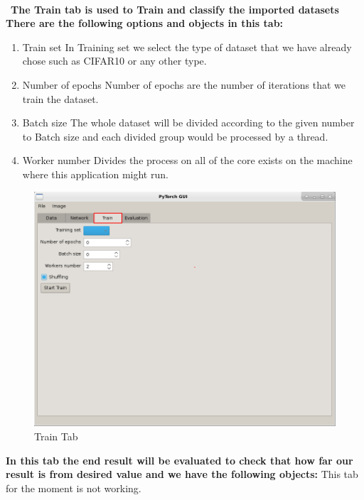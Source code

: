 \newpage

\\\
\textbf{The Train tab is used to Train and classify the imported datasets There are the following options and objects in this tab:}
\begin{enumerate}
    \item Train set \newline
        In Training set we select the type of dataset that we have already chose such as CIFAR10 or any other type.
    \item Number of epochs \newline
        Number of epochs are the number of iterations that we train the dataset.
    \item Batch size \newline
        The whole dataset will be divided according to the given number to Batch size and each divided group would be processed by a thread.
    \item Worker number \newline
        Divides the process on all of the core exists on the machine where this application might run.
\end{enumerate}

\begin{figure}[h!]
    \centering 
    \includegraphics[scale=0.4]{figures/app_screen_shoots/Train_tab.png}
    \caption{Train Tab}
\end{figure}


\textbf{In this tab the end result will be evaluated to check that how far our result is from desired value and we have the following objects:}
This tab for the moment is not working.

